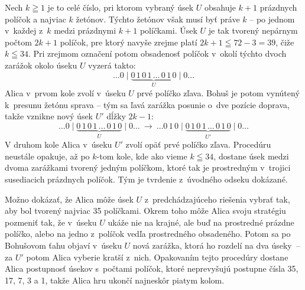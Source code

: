 {Nech $k\geqq1$ je to celé číslo, pri ktorom vybraný úsek
$U$ obsahuje $k+1$ prázdnych políčok a najviac $k$ žetónov.
Týchto žetónov však musí byť práve $k$ -- po jednom
v~každej z~$k$  medzi prázdnymi $k+1$ políčkami.
Úsek $U$ je tak tvorený nepárnym počtom $2k+1$ políčok, pre ktorý
navyše zrejme platí $2k+1\leqq 72-3=39$, čiže $k\leqq34$.
Pri zrejmom označení potom obsadenosť políčok v~okolí týchto
dvoch zarážok okolo úseku $U$ vyzerá takto:
$$
\dots0\mid \underbrace{0\,1\,0\,1\,\dots\,0\,1\,0}_{U}
\mid 0\dots
$$
Alica v~prvom kole zvolí v~úseku $U$ prvé políčko zľava.
Bohuš je potom vynútený k~presunu žetónu sprava -- tým sa ľavá
zarážka posunie o~dve pozície doprava, takže vznikne nový úsek $U'$
dĺžky $2k-1$:
$$
\dots 0\mid \underbrace{0\,1\,0\,1\,\dots\,0\,1\,0}_{U}\mid 0\dots\
\to\ \dots0\,1\,0\mid \underbrace{0\,1\,0\,1\,\dots\,0\,1\,0}_{U'}
\mid 0\dots
$$
V druhom kole Alica v~úseku $U'$ zvolí opäť prvé políčko zľava.
Procedúru neustále opakuje, až po $k$-tom kole, kde ako vieme
$k\leqq34$, dostane úsek medzi
dvoma zarážkami tvorený jedným políčkom, ktoré tak je prostredným
v~trojici susediacich prázdnych políčok. Tým je tvrdenie z~úvodného
odseku dokázané.

\poznamka
Možno dokázať, že Alica môže úsek $U$
z~predchádzajúceho riešenia vybrať tak, aby bol tvorený najviac 35 políčkami.
Okrem toho môže Alica svoju stratégiu pozmeniť tak, že v~úseku $U$
ukáže nie na krajné, ale buď na prostredné
prázdne políčko, alebo na jedno z~políčok vedľa prostredného obsadeného.
Potom sa po Bohušovom ťahu objaví v~úseku $U$ nová
zarážka, ktorá ho rozdelí na dva úseky~-- za $U'$ potom Alica vyberie
kratší z~nich. Opakovaním tejto procedúry dostane Alica postupnosť úsekov
s~počtami políčok, ktoré neprevyšujú postupne čísla 35, 17, 7, 3 a 1,
takže Alica hru ukončí najneskôr piatym kolom.
}

